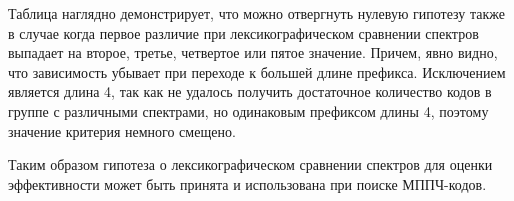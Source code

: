 Таблица наглядно демонстрирует, что можно отвергнуть нулевую гипотезу также в случае когда первое
различие при лексикографическом сравнении спектров выпадает на второе, третье, четвертое или пятое значение.
Причем, явно видно, что зависимость убывает при переходе к большей длине префикса. Исключением
является длина 4, так как не удалось получить достаточное количество кодов в группе с различными 
спектрами, но одинаковым префиксом длины 4, поэтому значение критерия немного смещено.

Таким образом гипотеза о лексикографическом сравнении спектров для оценки эффективности может быть
принята и использована при поиске МППЧ-кодов.



















































